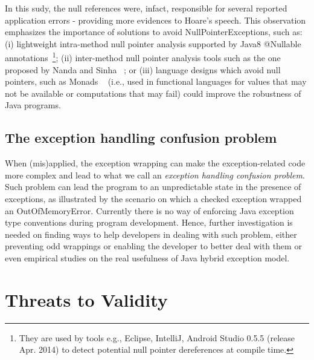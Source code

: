 \documentclass[conference]{IEEEtran}
\begin{document}
In this sudy, the null references were, infact, responsible for several reported application errors - providing more evidences to Hoare's speech.
This observation emphasizes the importance of solutions to avoid NullPointerExceptions, such as:
(i) lightweight intra-method null pointer analysis supported by Java8 @Nullable annotations~\footnote{They are used by tools e.g., Eclipse, IntelliJ, Android Studio 0.5.5 (release Apr. 2014) to detect potential 
null pointer dereferences at compile time.};
(ii) inter-method null pointer analysis tools such as the one proposed by Nanda and Sinha ~\cite{nanda2009accurate};
or (iii) language designs which avoid null pointers, such 
as Monads ~\cite{Walde95} (i.e., used in functional languages for values that may not be available 
or computations that may fail) could improve the robustness of Java programs. 


\subsection{The exception handling confusion problem}
When (mis)applied, the exception wrapping can make the exception-related code
 more complex and lead to what we call an \emph{exception handling confusion problem}.
Such problem can lead the program to an unpredictable state in the presence of exceptions,
as illustrated by the scenario on which a checked exception wrapped an OutOfMemoryError. 
Currently there is no way of enforcing Java exception type conventions during program development.
Hence, further investigation is needed on finding ways to help developers in dealing with such
 problem, either preventing odd wrappings or enabling the developer to better deal with them or even
empirical studies on the real usefulness of Java hybrid exception model. 




\section{Threats to Validity}
\label{sec:threats}
\end{document}
